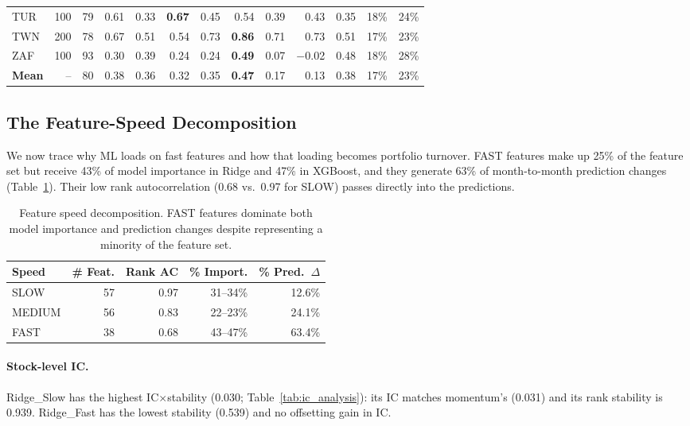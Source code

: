 \documentclass[sigconf,balance=false]{acmart}
\begin{document}
\begin{table}[t]
{\begin{tabular}{@{}lrcrrrrrrrrrr@{}}
TUR & 100 & 79  & 0.61 &  0.33 &  \textbf{0.67}  &  0.45 &  0.54 &  0.39 &  0.43 &  0.35 & 18\% & 24\% \\
TWN & 200 & 78  & 0.67 &  0.51 &  0.54  &  0.73 &  \textbf{0.86} &  0.71 &  0.73 &  0.51 & 17\% & 23\% \\
ZAF & 100 & 93  & 0.30 &  0.39 &  0.24  &  0.24 &  \textbf{0.49} &  0.07 &$-$0.02 &  0.48 & 18\% & 28\% \\
\midrule
\textbf{Mean} & -- & 80 & 0.38 & 0.36 & 0.32 & 0.35 & \textbf{0.47} & 0.17 & 0.13 & 0.38 & 17\% & 23\% \\
\bottomrule
\end{tabular}%
}
\end{table}


\subsection{The Feature-Speed Decomposition}
\label{sec:mechanism}

We now trace why ML loads on fast features and how that loading
becomes portfolio turnover. FAST features make up 25\% of the feature
set but receive 43\% of model importance in Ridge and 47\% in XGBoost,
and they generate 63\% of month-to-month prediction changes
(Table~\ref{tab:feature_speed}). Their low rank autocorrelation (0.68
vs.\ 0.97 for SLOW) passes directly into the predictions.

\begin{table}[t]
\centering
\caption{Feature speed decomposition. FAST features dominate both
model importance and prediction changes despite representing a
minority of the feature set.}
\label{tab:feature_speed}
\begin{tabular}{@{}lrrrr@{}}
\toprule
Speed & \# Feat. & Rank AC & \% Import. & \% Pred.\ $\Delta$ \\
\midrule
SLOW   & 57 & 0.97 & 31--34\%  & 12.6\% \\
MEDIUM & 56 & 0.83 & 22--23\%  & 24.1\% \\
FAST   & 38 & 0.68 & 43--47\%  & 63.4\% \\
\bottomrule
\end{tabular}
\end{table}


\paragraph{Stock-level IC.}
Ridge\_Slow has the highest IC$\times$stability
(0.030; Table~\ref{tab:ic_analysis}): its IC matches momentum's (0.031)
and its rank stability is 0.939. Ridge\_Fast has the lowest stability
(0.539) and no offsetting gain in IC.
\end{document}
